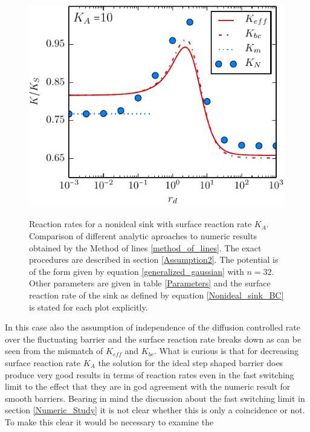 \begin{minipage}[t]{.63 \textwidth}
\begin{figure}[H]
        \hspace{-1cm } \includegraphics[width = 1 \textwidth]{plots/rep_rate_comparison2.pdf}
    \end{figure}
\end{minipage}
\begin{minipage}[t]{.37 \textwidth}
    \begin{figure}[H]
        \caption{Reaction rates for a nonideal sink with surface reaction rate $K_A$. Comparison of different analytic aproaches to numeric results obtained by the Method of lines \ref{method_of_lines}. The exact procedures are described in section \ref{Assumption2}. The potential is of the form given by equation \eqref{generalized_gaussian} with $n = 32$. Other parameters are given in table \ref{Parameters} and the surface reaction rate of the sink as defined by equation \eqref{Nonideal_sink_BC} is stated for each plot explicitly.\label{Rho_numeric}} 
    \end{figure}
    In this case also the assumption of independence of the diffusion controlled rate over the fluctuating barrier and the surface reaction rate breaks down as can be seen from the mismatch of $K_{eff}$ and $K_{bc}$. What is curious is that for decreasing surface reaction rate $K_A$ the solution for the ideal step shaped barrier does produce very good results in terms of reaction rates even in the fast switching limit to the effect that they are in god agreement with the numeric result for smooth barriers. Bearing in mind the discussion about the fast switching limit in section \ref{Numeric_Study} it is not clear whether this is only a coincidence or not. To make this clear it would be necessary to examine the \end{minipage}

